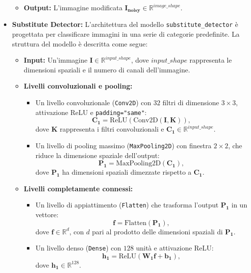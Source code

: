 \begin{itemize}
\begin{itemize}
        \item \textbf{Output:} L'immagine modificata $\mathbf{I_{noisy}} \in \mathbb{R}^{image\_shape}$.
    \end{itemize}
  

    \item \textbf{Substitute Detector:} 
    L'architettura del modello \texttt{substitute\_detector} è progettata per classificare immagini in una serie di categorie predefinite. La struttura del modello è descritta come segue:

    \begin{itemize}
        \item \textbf{Input:} Un'immagine $\mathbf{I} \in \mathbb{R}^{input\_shape}$, dove $input\_shape$ rappresenta le dimensioni spaziali e il numero di canali dell'immagine.
    
        \item \textbf{Livelli convoluzionali e pooling:}
        \begin{itemize}
            \item Un livello convoluzionale (\texttt{Conv2D}) con $32$ filtri di dimensione $3 \times 3$, attivazione ReLU e \texttt{padding="same"}:
            \[
            \mathbf{C_1} = \text{ReLU}(\text{Conv2D}(\mathbf{I}, \mathbf{K})),
            \]
            dove $\mathbf{K}$ rappresenta i filtri convoluzionali e $\mathbf{C_1} \in \mathbb{R}^{input\_shape}$.
            
            \item Un livello di pooling massimo (\texttt{MaxPooling2D}) con finestra $2 \times 2$, che riduce la dimensione spaziale dell'output:
            \[
            \mathbf{P_1} = \text{MaxPooling2D}(\mathbf{C_1}),
            \]
            dove $\mathbf{P_1}$ ha dimensioni spaziali dimezzate rispetto a $\mathbf{C_1}$.
        \end{itemize}
    
        \item \textbf{Livelli completamente connessi:}
        \begin{itemize}
            \item Un livello di appiattimento (\texttt{Flatten}) che trasforma l'output $\mathbf{P_1}$ in un vettore:
            \[
            \mathbf{f} = \text{Flatten}(\mathbf{P_1}),
            \]
            dove $\mathbf{f} \in \mathbb{R}^{d}$, con $d$ pari al prodotto delle dimensioni spaziali di $\mathbf{P_1}$.
    
            \item Un livello denso (\texttt{Dense}) con $128$ unità e attivazione ReLU:
            \[
            \mathbf{h_1} = \text{ReLU}(\mathbf{W_1}\mathbf{f} + \mathbf{b_1}),
            \]
            dove $\mathbf{h_1} \in \mathbb{R}^{128}$.
    

\end{itemize}
\end{itemize}
\end{itemize}
